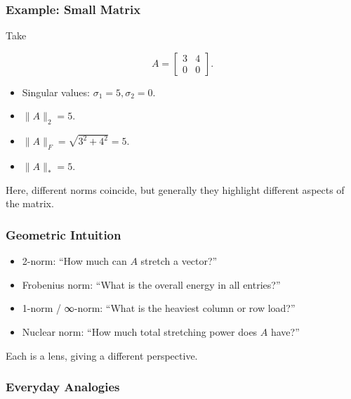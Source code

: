 \documentclass[
  letterpaper,
  DIV=11,
  numbers=noendperiod]{scrreprt}
\providecommand{\tightlist}{%
  \setlength{\itemsep}{0pt}\setlength{\parskip}{0pt}}
\begin{document}
\subsubsection{Example: Small Matrix}\label{example-small-matrix}

Take

\[
A = \begin{bmatrix}3 & 4 \\ 0 & 0\end{bmatrix}.
\]

\begin{itemize}
\tightlist
\item
  Singular values: \(\sigma_1 = 5, \sigma_2 = 0\).
\item
  \(\|A\|_2 = 5\).
\item
  \(\|A\|_F = \sqrt{3^2 + 4^2} = 5\).
\item
  \(\|A\|_* = 5\).
\end{itemize}

Here, different norms coincide, but generally they highlight different
aspects of the matrix.

\subsubsection{Geometric Intuition}\label{geometric-intuition-8}

\begin{itemize}
\tightlist
\item
  2-norm: ``How much can \(A\) stretch a vector?''
\item
  Frobenius norm: ``What is the overall energy in all entries?''
\item
  1-norm / ∞-norm: ``What is the heaviest column or row load?''
\item
  Nuclear norm: ``How much total stretching power does \(A\) have?''
\end{itemize}

Each is a lens, giving a different perspective.

\subsubsection{Everyday Analogies}\label{everyday-analogies-83}
\end{document}
